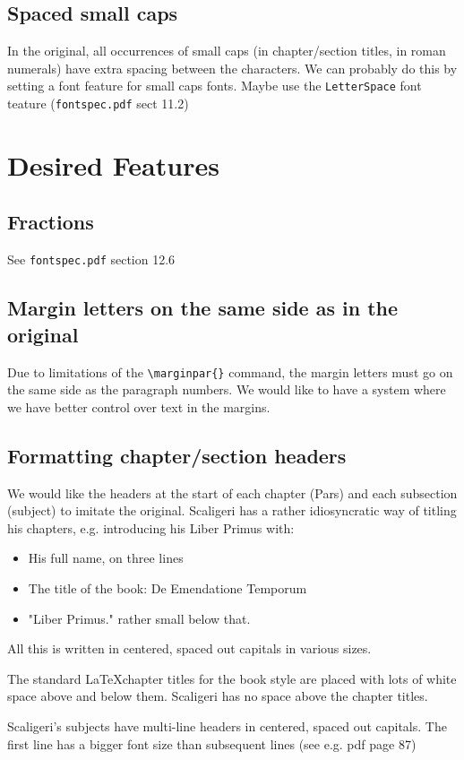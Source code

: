 \documentclass{report}
\begin{document}
\section{Spaced small caps}
In the original, all occurrences of small caps (in chapter/section titles, in roman numerals) have extra spacing between
the characters. We can probably do this by setting a font feature for small caps fonts.
Maybe use the \texttt{LetterSpace} font teature (\texttt{fontspec.pdf} sect 11.2)

\chapter{Desired Features}
\section{Fractions}
See \texttt{fontspec.pdf} section 12.6

\section{Margin letters on the same side as in the original}
Due to limitations of the \verb;\marginpar{}; command, the margin letters must go on the same side as the
paragraph numbers. We would like to have a system where we have better control over text in the margins.

\section{Formatting chapter/section headers}
We would like the headers at the start of each chapter (Pars) and each subsection (subject) to imitate the original.
Scaligeri has a rather idiosyncratic way of titling his chapters, e.g. introducing his Liber Primus with:
\begin{itemize}
\item His full name, on three lines
\item The title of the book: De Emendatione Temporum
\item "Liber Primus." rather small below that.
\end{itemize}
All this is written in centered, spaced out capitals in various sizes.

The standard \LaTeX chapter titles for the book style are placed with lots of white space above and below them. Scaligeri has no space above the chapter titles.

Scaligeri's subjects have multi-line headers in centered, spaced out capitals. The first line has a bigger font size than
subsequent lines (see e.g. pdf page 87)
\end{document}
